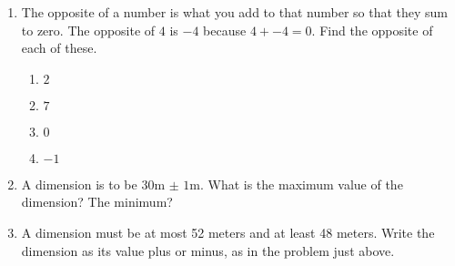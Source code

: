 \documentclass[12pt]{article}
\begin{document}
\begin{enumerate}
\begin{multicols}{2}
\begin{enumerate}
    \item \hspace{0.250in} $-3*5$
  \vspace{0.25in}

    \item \hspace{0.250in} $-4*(-8)$
  \vspace{0.25in}

    \item \hspace{0.250in} $0*(-5)$
  \vspace{0.25in}

    \item \hspace{0.250in} $(-10)*(-12)$
  \vspace{0.25in}

\end{enumerate}
\end{multicols}

	    \vspace{0.50in}

\item The opposite of a number is what you add to that number so that they sum to zero. The opposite of $4$ is $-4$ because $4+{-4}=0$. Find the opposite of each of these. 
\begin{multicols}{2}
\begin{enumerate}

    \item \hspace{0.250in} $2$
  \vspace{0.25in}

    \item \hspace{0.250in} $7$
  \vspace{0.25in}

    \item \hspace{0.250in} $0$
  \vspace{0.25in}

    \item \hspace{0.250in} $-1$
  \vspace{0.25in}

\end{enumerate}
\end{multicols}

\item A dimension is to be $30$m $\pm$ $1$m. What is the maximum value of the dimension? The minimum? 
\item A dimension must be at most 52 meters and at least 48 meters. Write the dimension as its value plus or minus, as in the problem just above.  
    \end{enumerate}
\end{document}

